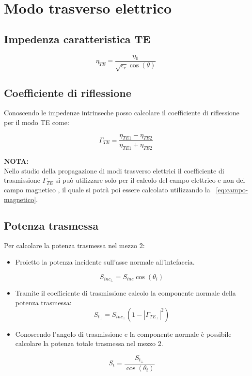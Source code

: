 \documentclass[10pt,a4paper]{report}
\begin{document}
	\section{Modo trasverso elettrico}

		\subsection{Impedenza caratteristica TE}
			\begin{equation}
			\eta_{TE}=\frac{\eta_0}{\sqrt{\epsilon_r}\cos(\theta)}
			\end{equation}

		\subsection{Coefficiente di riflessione}
			Conoscendo le impedenze intrinseche posso calcolare il coefficiente di riflessione per il modo TE come:

			\[
			\Gamma_{TE}=\frac{\eta_{TE1}-\eta_{TE2}}{\eta_{TE1}+\eta_{TE2}}
			\]

			 \textbf{NOTA:}
			 \\ 
			 Nello studio della propagazione di modi trasverso elettrici il coefficiente di trasmissione $\Gamma_{TE}$ si può utilizzare solo per il calcolo del campo elettrico e non del campo magnetico , il quale si potrà poi essere calcolato utilizzando la ~\ref{eq:campo-magnetico}.

		\subsection{Potenza trasmessa}

			Per calcolare la potenza trasmessa nel mezzo 2:
			\begin{itemize}
			\item Proietto la potenza incidente sull'asse normale all'intefaccia.

			\begin{equation}
			S_{inc_\perp}=S_{inc}\cos(\theta_i)
			\end{equation}

			\item Tramite il coefficiente di trasmissione calcolo la componente normale della potenza trasmessa:
			\begin{equation}
			S_{t_\perp}=S_{inc_\perp}(1-|\Gamma_{TE_\perp}|^2)
			\end{equation}

			\item Conoscendo l'angolo di trasmissione e la componente normale è possibile calcolare la potenza totale trasmessa nel mezzo 2.

			\begin{equation}
			S_{t}=\frac{S_{t_\perp}}{\cos(\theta_t)}
			\end{equation}
			\end{itemize}
\end{document}
